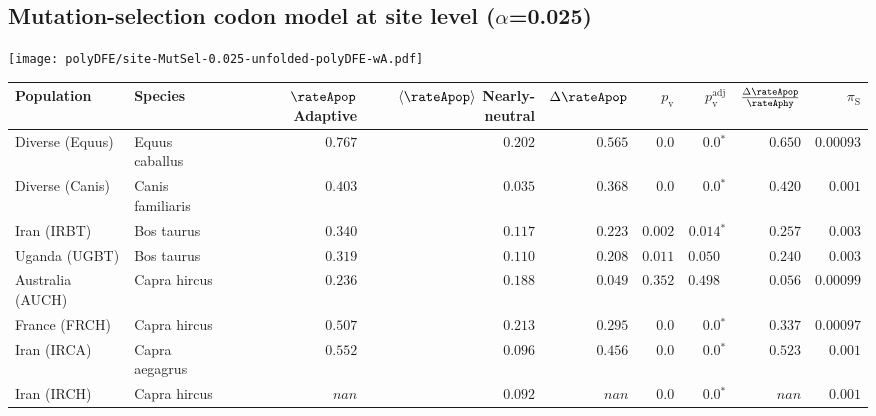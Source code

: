 \subsection{Mutation-selection codon model at site level ($\alpha$=0.025)}
\begin{center}
    \texttt{[image: polyDFE/site-MutSel-0.025-unfolded-polyDFE-wA.pdf]}
    \begin{adjustbox}{width = 1\textwidth}
                \begin{tabular}{|l|l|r|r|r|r|r|r|r|}
            \toprule
            Population & Species & \specialcell{$\rateApop$ \\ Adaptive}                & \specialcell{$\left< \rateApop \right>$ \\ Nearly-neutral}                & $\Delta \rateApop $    & $p_{\mathrm{v}}$ & $p_{\mathrm{v}}^{\mathrm{adj}}$ & $\frac{\Delta\rateApop}{\rateAphy}$ & $\pi_{\textrm{S}}$    \\
            \midrule
            Diverse (Equus)                    & Equus caballus          & $ 0.767$ & $ 0.202$ & $ 0.565$ & $0.0$ & $\bm{0.0{^*}}$ & $ 0.650$ & $0.00093$ \\
            Diverse (Canis)                  & Canis familiaris          & $ 0.403$ & $ 0.035$ & $ 0.368$ & $0.0$ & $\bm{0.0{^*}}$        & $ 0.420$ & $ 0.001$ \\
            Iran (IRBT)               & Bos taurus        & $ 0.340$ & $ 0.117$ & $ 0.223$ & $ 0.002$ & $\bm{ 0.014{^*}}$        & $ 0.257$ & $ 0.003$ \\
            Uganda (UGBT)                  & Bos taurus        & $ 0.319$ & $ 0.110$ & $ 0.208$ & $ 0.011$    & $ 0.050~~$    & $ 0.240$ & $ 0.003$ \\
            Australia (AUCH)                    & Capra hircus      & $ 0.236$ & $ 0.188$ & $ 0.049$ & $ 0.352$    & $ 0.498~~$    & $ 0.056$ & $0.00099$ \\
            France (FRCH)                    & Capra hircus        & $ 0.507$    & $ 0.213$ & $ 0.295$    & $0.0$    & $\bm{0.0{^*}}$    & $ 0.337$    & $0.00097$  \\
            Iran (IRCA)                   & Capra aegagrus        & $ 0.552$ & $ 0.096$ & $ 0.456$ & $0.0$ & $\bm{0.0{^*}}$        & $ 0.523$ & $ 0.001$ \\
            Iran (IRCH)                 & Capra hircus        & $   nan$ & $ 0.092$ & $   nan$ & $0.0$    & $\bm{0.0{^*}}$    & $   nan$ & $ 0.001$ \\

\end{tabular}
\end{adjustbox}
\end{center}
